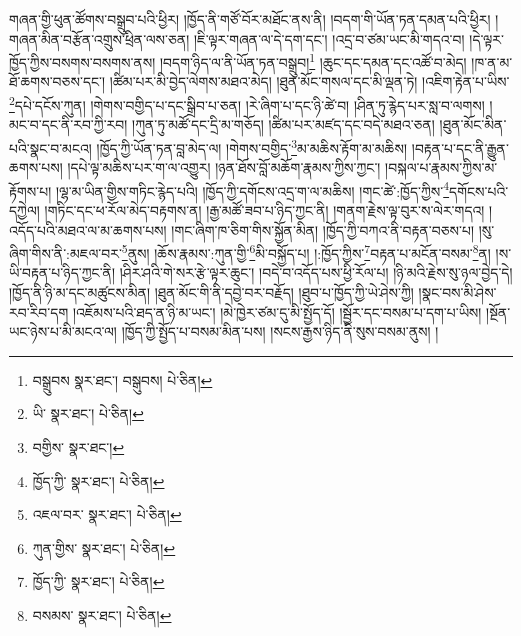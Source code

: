 གཞན་གྱི་ཕུན་ཚོགས་བསྒྲུབ་པའི་ཕྱིར། །ཁྱོད་ནི་གཙོ་བོར་མཐོང་ནས་ནི། །བདག་གི་ཡོན་ཏན་དམན་པའི་ཕྱིར། །གཞན་མིན་བརྩོན་འགྲུས་ཕྲིན་ལས་ཅན། །ཇི་ལྟར་གཞན་ལ་དེ་དག་དང་། །འདྲ་བ་ཙམ་ཡང་མི་གདའ་བ། །དེ་ལྟར་ཁྱོད་ཀྱིས་བསགས་བསགས་ནས། །བདག་ཉིད་ལ་ནི་ཡོན་ཏན་བསྒྲུབ།\footnote{བསྒྲུབས  སྣར་ཐང་། བསྒུབས།  པེ་ཅིན། } །ཆུང་དང་དམན་དང་འཚོ་བ་མེད། །ཁ་ན་མ་ཐོ་ཆགས་བཅས་དང་། །ཚིམ་པར་མི་བྱེད་ལེགས་མཐའ་མེད། །ཐུན་མོང་གསལ་དང་མི་ལྡན་ཏེ། །འཇིག་རྟེན་པ་ཡིས་\footnote{ཡི་  སྣར་ཐང་།  པེ་ཅིན། }དཔེ་དངོས་ཀུན། །གེགས་བགྱིད་པ་དང་སྒྲིབ་པ་ཅན། །རེ་ཞིག་པ་དང་ཉི་ཚེ་བ། །ཤིན་ཏུ་རྙེད་པར་སླ་བ་ལགས། །མང་བ་དང་ནི་རབ་ཀྱི་རབ། །ཀུན་ཏུ་མཚོ་དང་དྲི་མ་གཅོད། །ཚིམ་པར་མཛད་དང་བདེ་མཐའ་ཅན། །ཐུན་མོང་མིན་པའི་སྣང་བ་མངའ། །ཁྱོད་ཀྱི་ཡོན་ཏན་བླ་མེད་ལ། །གེགས་བགྱིད་\footnote{བགྱིས་  སྣར་ཐང་། }མ་མཆིས་རྟོག་མ་མཆིས། །བརྟན་པ་དང་ནི་རྒྱུན་ཆགས་པས། །དཔེ་ལྟ་མཆིས་པར་ག་ལ་འགྱུར། །ཉན་ཐོས་བློ་མཆོག་རྣམས་ཀྱིས་ཀྱང་། །བསྐལ་པ་རྣམས་ཀྱིས་མ་རྟོགས་པ། །ལྷ་མ་ཡིན་གྱིས་གཏིང་རྙེད་པའི། །ཁྱོད་ཀྱི་དགོངས་འདྲ་ག་ལ་མཆིས། །གང་ཚེ་:ཁྱོད་ཀྱིས་\footnote{ཁྱོད་ཀྱི་  སྣར་ཐང་།  པེ་ཅིན། }དགོངས་པའི་དཀྱེལ། །གཏིང་དང་ཕ་རོལ་མེད་བརྟགས་ན། །རྒྱ་མཚོ་ཟབ་པ་ཉིད་ཀྱང་ནི། །གནག་རྗེས་ལྟ་བུར་ས་ལེར་གདའ། །འདོད་པའི་མཐའ་ལ་མ་ཆགས་པས། །གང་ཞིག་ཁ་ཅིག་གིས་སྐྱོན་མིན། །ཁྱོད་ཀྱི་བཀའ་ནི་བརྟན་བཅས་པ། །སུ་ཞིག་གིས་ནི་:མཇལ་བར་\footnote{འཇལ་བར་  སྣར་ཐང་།  པེ་ཅིན། }ནུས། །ཆོས་རྣམས་:ཀུན་གྱི་\footnote{ཀུན་གྱིས་  སྣར་ཐང་།  པེ་ཅིན། }མི་བསྐྱོད་པ། །:ཁྱོད་ཀྱིས་\footnote{ཁྱོད་ཀྱི་  སྣར་ཐང་།  པེ་ཅིན། }བརྟན་པ་མངོན་བསམ་\footnote{བསམས་  སྣར་ཐང་།  པེ་ཅིན། }ན། །ས་ཡི་བརྟན་པ་ཉིད་ཀྱང་ནི། །ཤིར་ཤའི་གེ་སར་རྩེ་ལྟར་ཆུང་། །བདེ་བ་འདོད་པས་ཕྱི་རོལ་པ། །ཉི་མའི་རྗེས་སུ་ཉལ་བྱེད་དེ། །ཁྱོད་ནི་ཉི་མ་དང་མཚུངས་མིན། །ཐུན་མོང་གི་ནི་དབྱེ་བར་བརྗོད། །ཐུབ་པ་ཁྱོད་ཀྱི་ཡེ་ཤེས་ཀྱི། །སྣང་བས་མི་ཤེས་རབ་རིབ་དག །འཇོམས་པའི་ཐད་ན་ཉི་མ་ཡང་། །མེ་ཁྱེར་ཙམ་དུ་མི་སྤྱོད་དོ། །སྦྱོར་དང་བསམ་པ་དག་པ་ཡིས། །སྔོན་ཡང་ཉེས་པ་མི་མངའ་ལ། །ཁྱོད་ཀྱི་སྤྱོད་པ་བསམ་མིན་པས། །སངས་རྒྱས་ཉིད་ནི་སུས་བསམ་ནུས། །
